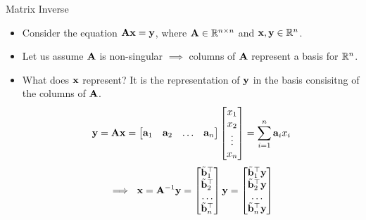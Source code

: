 \documentclass[aspectratio=169]{beamer}
\let\olditem\item
\renewcommand{\item}{\setlength{\itemsep}{\fill}\olditem}
\def\mf{\ensuremath\mathbf}
\def\mb{\ensuremath\mathbb}
\begin{document}
\begin{frame}[t]{Matrix Inverse}
\begin{itemize}
    \item Consider the equation $\mf{Ax} = \mf{y}$, where $\mf{A} \in \mb{R}^{n \times n}$ and $\mf{x}, \mf{y} \in \mb{R}^n$. 

    \item Let us assume $\mf{A}$ is non-singular $\implies$ columns of $\mf{A}$ represent a basis for $\mb{R}^n$.

    \item What does $\mf{x}$ represent? It is the representation of $\mf{y}$ in the basis consisitng of the columns of $\mf{A}$.
    \[ \mf{y} = \mf{Ax} = \begin{bmatrix*}\mf{a}_1 & \mf{a}_2 & \ldots & \mf{a}_n\end{bmatrix*}\begin{bmatrix*}x_1 \\ x_2 \\ \vdots \\ x_n\end{bmatrix*} = \sum_{i=1}^{n}\mf{a}_i x_i\]
    \[ \implies \,\, \mf{x} = \mf{A}^{-1}\mf{y} = \begin{bmatrix*}\tilde{\mf{b}}_1^\top \\ \tilde{\mf{b}}_2^\top \\ \ldots \\ \tilde{\mf{b}}_n^\top\end{bmatrix*}\mf{y} = \begin{bmatrix*}\tilde{\mf{b}}_1^\top\mf{y} \\ \tilde{\mf{b}}_2^\top\mf{y} \\ \ldots \\ \tilde{\mf{b}}_n^\top\mf{y}\end{bmatrix*} \]
\end{itemize}
\end{frame}
\end{document}

